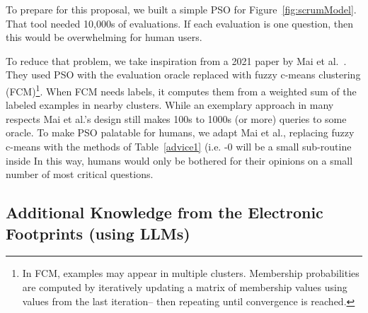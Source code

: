 \documentclass[twoside]{NSF}
\newcommand{\IT}{{\sffamily {\em \mbox{ADVICE}}}}
\newcommand{\ITS}[1]{\mbox{{\IT}-#1}}
\begin{document}
\begin{nsfdescription}
 To prepare for this proposal, we built a simple PSO 
for Figure~\ref{fig:scrumModel}. That tool needed   10,000s of evaluations. If each  evaluation is one   question, then this would  be  overwhelming for human users.
 
To reduce that problem, we take inspiration from a
2021 paper by Mai et al.~\cite{MAI2021398}. They 
used PSO  
with the evaluation oracle replaced with   fuzzy c-means clustering (FCM)\footnote{In FCM, examples
may appear in   multiple clusters. Membership probabilities are
computed by iteratively updating  a matrix of membership values   using
values from the last iteration-- then repeating until convergence is reached.}.  When  FCM needs labels, it computes them from  a weighted sum of the labeled examples in   nearby clusters.  While an exemplary approach in many respects Mai et al.'s design  still makes 100s to 1000s (or more) queries
to some oracle. To make PSO palatable for humans,
    we adapt  Mai et al., replacing fuzzy c-means with the methods of  Table~\ref{advice1} (i.e. {\ITS{0}}
    will be a small sub-routine inside {\IT}
    In this way, humans would   only be bothered
    for their opinions on a small number of   most  critical questions.

 \subsection{ Additional Knowledge from the Electronic Footprints (using LLMs)}\label{cloud}





\end{nsfdescription}
\end{document}
